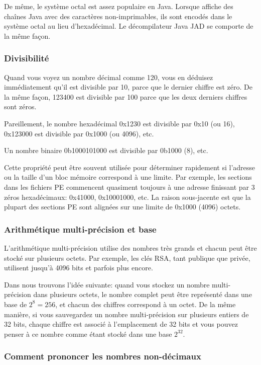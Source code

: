 De même, le système octal est assez populaire en Java. Lorsque \IDA affiche des
chaînes Java avec des caractères non-imprimables, ils sont encodés dans le système
octal au lieu d'hexadécimal.
Le décompilateur Java JAD se comporte de la même façon.

\subsubsection{Divisibilité}

Quand vous voyez un nombre décimal comme 120, vous en déduisez immédiatement qu'il
est divisible par 10, parce que le dernier chiffre est zéro.
De la même façon, 123400 est divisible par 100 parce que les deux derniers chiffres
sont zéros.

Pareillement, le nombre hexadécimal 0x1230 est divisible par 0x10 (ou 16),
0x123000 est divisible par 0x1000 (ou 4096), etc.

Un nombre binaire 0b1000101000 est divisible par 0b1000 (8), etc.

Cette propriété peut être souvent utilisée pour déterminer rapidement si l'adresse
ou la taille d'un bloc mémoire correspond à une limite.
Par exemple, les sections dans les fichiers \ac{PE} commencent quasiment toujours
à une adresse finissant par 3 zéros hexadécimaux: 0x41000, 0x10001000, etc. La raison
sous-jacente est que la plupart des sections \ac{PE} sont alignées sur une limite
de 0x1000 (4096) octets.

\subsubsection{Arithmétique multi-précision et base}

L'arithmétique multi-précision utilise des nombres très grands et chacun peut être
stocké sur plusieurs octets. Par exemple, les clés RSA, tant publique que privée,
utilisent jusqu'à 4096 bits et parfois plus encore.

Dans  nous trouvons l'idée suivante: quand vous
stockez un nombre multi-précision dans plusieurs octets, le nombre complet peut être
représenté dans une base de $2^8=256$, et chacun des chiffres correspond à un octet.
De la même manière, si vous sauvegardez un nombre multi-précision sur plusieurs
entiers de 32 bits, chaque chiffre est associé à l'emplacement de 32 bits et vous
pouvez penser à ce nombre comme étant stocké dans une base $2^{32}$.

\subsubsection{Comment prononcer les nombres non-décimaux}

